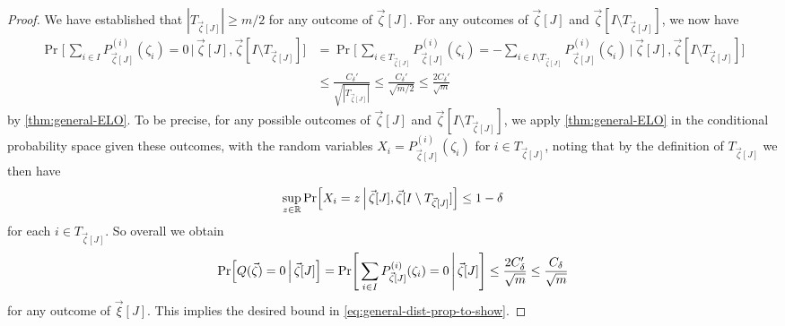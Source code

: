 \documentclass[english]{article}
\theoremstyle{remark}
\numberwithin{equation}{section}
\numberwithin{figure}{section}
\newcommand{\RR}{\mathbb{R}}
\begin{document}
\begin{proof}
We have established that $|T_{\vec \zeta[J]}|\ge m/2$ for any outcome of $\vec \zeta[J]$. 
For any outcomes of $\vec \zeta[J]$ and $\vec\zeta[I\setminus T_{\vec \zeta[J]}]$, we now have
\begin{align*}\Pr\Biggl[\,\sum_{i\in I} P_{\vec \zeta[J]}^{(i)}(\zeta_i)=0\,\Bigg|\,\vec \zeta[J],\vec\zeta[I\setminus T_{\vec \zeta[J]}]\Biggr]&=\Pr\Biggl[\,\sum_{i\in T_{\vec \zeta[J]}} P_{\vec \zeta[J]}^{(i)}(\zeta_i)=-\!\!\!\sum_{i\in I\setminus T_{\vec \zeta[J]}} P_{\vec \zeta[J]}^{(i)}(\zeta_i)\,\Bigg|\,\vec \zeta[J],\vec\zeta[I\setminus T_{\vec \zeta[J]}]\Biggr]\\
&\le \frac{C_\delta'}{\sqrt{|T_{\vec \zeta[J]}|}}\le  \frac{C_\delta'}{\sqrt{m/2}} \le\frac{2C_\delta'}{\sqrt{m}}\end{align*}
by \cref{thm:general-ELO}. To be precise, for any possible outcomes of $\vec \zeta[J]$ and $\vec\zeta[I\setminus T_{\vec \zeta[J]}]$, we apply \cref{thm:general-ELO} in the conditional probability space given these outcomes, with the random variables $X_i=P_{\vec \zeta[J]}^{(i)}(\zeta_i)$ for $i\in T_{\vec \zeta[J]}$, noting that by the definition of $T_{\vec \zeta[J]}$ we then have
\[\sup_{z\in \RR}\Pr\Bigl[X_i=z\,\Big|\,\vec \zeta[J],\vec\zeta[I\setminus T_{\vec \zeta[J]}]\Bigr]\le 1-\delta\] for each $i\in T_{\vec \zeta[J]}$. So overall we obtain
\[\Pr\Bigl[Q(\vec \zeta)=0\,\Big|\,\vec \zeta[J]\Bigr]=\Pr\Biggl[\,\sum_{i\in I} P_{\vec \zeta[J]}^{(i)}(\zeta_i)=0\,\Bigg|\,\vec \zeta[J]\Biggr]\le \frac{2C_\delta'}{\sqrt{m}}\le\frac{C_\delta}{\sqrt{m}}\]
for any outcome of $\vec \xi[J]$. This implies the desired bound in \cref{eq:general-dist-prop-to-show}.
\end{proof}
\end{document}
